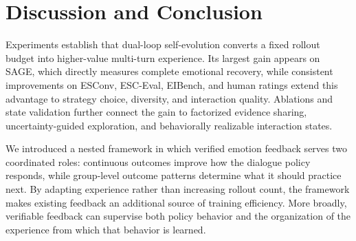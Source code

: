 \documentclass[letterpaper]{article}
\begin{document}
\section{Discussion and Conclusion}
Experiments establish that dual-loop self-evolution converts a fixed rollout budget into higher-value multi-turn experience. Its largest gain appears on SAGE, which directly measures complete emotional recovery, while consistent improvements on ESConv, ESC-Eval, EIBench, and human ratings extend this advantage to strategy choice, diversity, and interaction quality. Ablations and state validation further connect the gain to factorized evidence sharing, uncertainty-guided exploration, and behaviorally realizable interaction states.

We introduced a nested framework in which verified emotion feedback serves two coordinated roles: continuous outcomes improve how the dialogue policy responds, while group-level outcome patterns determine what it should practice next. By adapting experience rather than increasing rollout count, the framework makes existing feedback an additional source of training efficiency. More broadly, verifiable feedback can supervise both policy behavior and the organization of the experience from which that behavior is learned.


\end{document}
